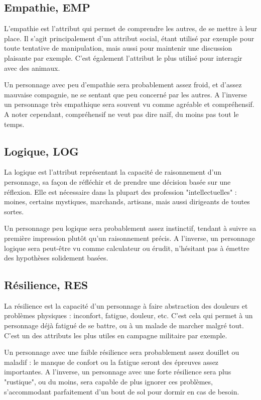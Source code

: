 \documentclass[10pt,a4paper,twocolumn]{book}
\begin{document}
\subsection{Empathie, EMP}
L'empathie est l'attribut qui permet de comprendre les autres, de se mettre à leur place. Il s'agit principalement d'un attribut social, étant utilisé par exemple pour toute tentative de manipulation, mais aussi pour maintenir une discussion plaisante par exemple. C'est également l'attribut le plus utilisé pour interagir avec des animaux.

Un personnage avec peu d'empathie sera probablement assez froid, et d'assez mauvaise compagnie, ne se sentant que peu concerné par les autres. A l'inverse un personnage très empathique sera souvent vu comme agréable et compréhensif. A noter cependant, compréhensif ne veut pas dire naïf, du moins pas tout le temps.
\subsection{Logique, LOG}
La logique est l'attribut représentant la capacité de raisonnement d'un personnage, sa façon de réfléchir et de prendre une décision basée sur une réflexion. Elle est nécessaire dans la plupart des profession "intellectuelles" : moines, certains mystiques, marchands, artisans, mais aussi dirigeants de toutes sortes.

Un personnage peu logique sera probablement assez instinctif, tendant à suivre sa première impression plutôt qu'un raisonnement précis. A l'inverse, un personnage logique sera peut-être vu comme calculateur ou érudit, n'hésitant pas à émettre des hypothèses solidement basées.
\subsection{Résilience, RES}
La résilience est la capacité d'un personnage à faire abstraction des douleurs et problèmes physiques : inconfort, fatigue, douleur, etc. C'est cela qui permet à un personnage déjà fatigué de se battre, ou à un malade de marcher malgré tout. C'est un des attributs les plus utiles en campagne militaire par exemple.

Un personnage avec une faible résilience sera probablement assez douillet ou maladif : le manque de confort ou la fatigue seront des épreuves assez importantes. A l'inverse, un personnage avec une forte résilience sera plus "rustique", ou du moins, sera capable de plus ignorer ces problèmes, s’accommodant parfaitement d'un bout de sol pour dormir en cas de besoin.
\end{document}
